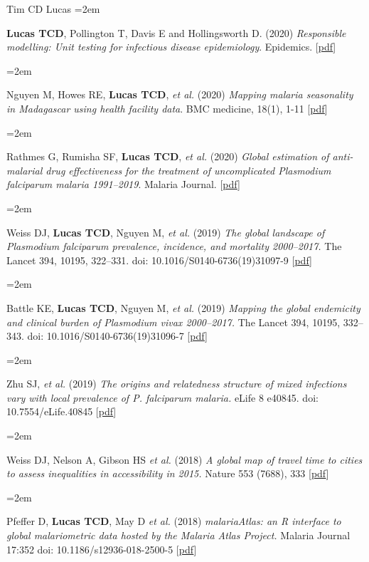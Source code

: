 \documentclass{scrartcl}
\newcommand{\MarginText}[1]{\marginpar{\raggedleft\itshape\small#1}} %
\newcommand{\Description}[1]{\hangindent=2em\hangafter=0\noindent\raggedright\footnotesize{#1}\par\normalsize\vspace{1em}} %
\begin{document}
\begin{cv}{Tim {\Large CD} Lucas}
\Description{\textbf{Lucas TCD}, Pollington T, Davis E and Hollingsworth D. (2020) \emph{Responsible modelling: Unit testing for infectious disease epidemiology}. Epidemics. [\href{https://www.sciencedirect.com/science/article/pii/S1755436520300451}{pdf}]}



\Description{Nguyen M, Howes RE, \textbf{Lucas TCD},  \emph{et al.} (2020) \emph{Mapping malaria seasonality in Madagascar using health facility data}. BMC medicine, 18(1), 1-11 [\href{https://bmcmedicine.biomedcentral.com/track/pdf/10.1186/s12916-019-1486-3}{pdf}]}


\Description{Rathmes G, Rumisha SF, \textbf{Lucas TCD}, \emph{et al.} (2020) \emph{Global estimation of anti-malarial drug effectiveness for the treatment of uncomplicated \emph{Plasmodium falciparum} malaria 1991--2019}. Malaria Journal. [\href{https://link.springer.com/article/10.1186/s12936-020-03446-8}{pdf}]}



\Description{\MarginText{2019}Weiss DJ, \textbf{Lucas TCD}, Nguyen M, \emph{et al.} (2019) \emph{The global landscape of \emph{Plasmodium falciparum} prevalence, incidence, and mortality 2000--2017.} The Lancet 394, 10195, 322--331. doi: 10.1016/S0140-6736(19)31097-9 [\href{https://doi.org/10.1016/S0140-6736(19)31097-9}{pdf}]}

\Description{Battle KE, \textbf{Lucas TCD},  Nguyen M, \emph{et al.} (2019) \emph{Mapping the global endemicity and clinical burden of \emph{Plasmodium vivax} 2000--2017.} The Lancet 394, 10195, 332--343. doi: 10.1016/S0140-6736(19)31096-7 [\href{https://doi.org/10.1016/S0140-6736(19)31096-7}{pdf}]}



\Description{Zhu SJ, \emph{et al.} (2019) \emph{The origins and relatedness structure of mixed infections vary with local prevalence of \emph{P. falciparum} malaria.} eLife 8 e40845. doi: 10.7554/eLife.40845 [\href{https://doi.org/10.7554/eLife.40845}{pdf}]}




\Description{\MarginText{2018}Weiss DJ, Nelson A, Gibson HS \emph{et al.} (2018) \emph{A global map of travel time to cities to assess inequalities in accessibility in 2015.} Nature 553 (7688), 333 [\href{https://www.nature.com/articles/nature25181.pdf}{pdf}]}

\Description{Pfeffer D, \textbf{Lucas TCD}, May D \emph{et al.} (2018) \emph{malariaAtlas: an R interface to global malariometric data hosted by the Malaria Atlas Project.} Malaria Journal 17:352 doi: 10.1186/s12936-018-2500-5 [\href{https://malariajournal.biomedcentral.com/track/pdf/10.1186/s12936-018-2500-5}{pdf}]}



\end{cv}
\end{document}
